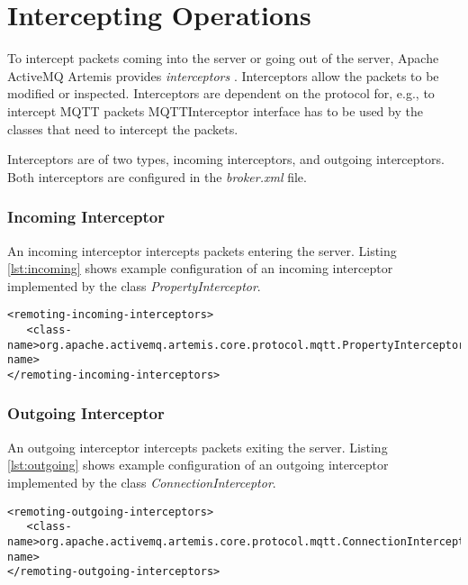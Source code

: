 \section{Intercepting Operations}

To intercept packets coming into the server or going out of the server, Apache ActiveMQ Artemis provides \textit{interceptors} \parencite{artemis_interceptors}. Interceptors allow the packets to be modified or inspected. Interceptors are dependent on the protocol for, e.g., to intercept MQTT packets MQTTInterceptor interface has to be used by the classes that need to intercept the packets. 

Interceptors are of two types, incoming interceptors, and outgoing interceptors. Both interceptors are configured in the \textit{broker.xml} file.

\subsubsection{Incoming Interceptor} \label{subsubsection:in_interceptor}

An incoming interceptor intercepts packets entering the server. Listing \ref{lst:incoming} shows example configuration of an incoming interceptor implemented by the class \textit{PropertyInterceptor}.

\bigskip
\begin{lstlisting}[style=XmlInputStyle,caption=Configuring Incoming Interceptor Example, label={lst:incoming}]
<remoting-incoming-interceptors>
   <class-name>org.apache.activemq.artemis.core.protocol.mqtt.PropertyInterceptor</class-name>
</remoting-incoming-interceptors>
\end{lstlisting}

\subsubsection{Outgoing Interceptor}

An outgoing interceptor intercepts packets exiting the server. Listing \ref{lst:outgoing} shows example configuration of an outgoing interceptor implemented by the class \textit{ConnectionInterceptor}.

\bigskip
\begin{lstlisting}[style=XmlInputStyle,caption=Configuring Outgoing Interceptor Example, label={lst:outgoing}]
<remoting-outgoing-interceptors>
   <class-name>org.apache.activemq.artemis.core.protocol.mqtt.ConnectionInterceptor</class-name>
</remoting-outgoing-interceptors>
\end{lstlisting}